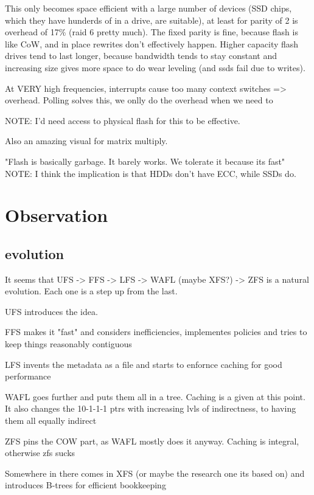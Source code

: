 \documentclass[a4paper]{report}
\begin{document}
        This only becomes space efficient with a large number of devices (SSD
        chips, which they have hunderds of in a drive, are suitable), at least
        for parity of 2 is overhead of 17\% (raid 6 pretty much). The fixed
        parity is fine, because flash is like CoW, and in place rewrites don't
        effectively happen. Higher capacity flash drives tend to last longer,
        because bandwidth tends to stay constant and increasing size gives more
        space to do wear leveling (and ssds fail due to writes).

        At VERY high frequencies, interrupts cause too many context switches =>
        overhead. Polling solves this, we onlly do the overhead when we need to

        NOTE: I'd need access to physical flash for this to be effective.

        Also an amazing visual for matrix multiply.

        "Flash is basically garbage. It barely works. We tolerate it because its fast"
        NOTE: I think the implication is that HDDs don't have ECC, while SSDs do.

\section{Observation}
    \subsection{evolution}

        It seems that UFS -> FFS -> LFS -> WAFL (maybe XFS?) -> ZFS is a
        natural evolution. Each one is a step up from the last.

        UFS introduces the idea.

        FFS makes it "fast" and considers inefficiencies, implementes policies
        and tries to keep things reasonably contiguous

        LFS invents the metadata as a file and starts to enfornce caching for
        good performance

        WAFL goes further and puts them all in a tree. Caching is a given at
        this point. It also changes the 10-1-1-1 ptrs with increasing lvls of
        indirectness, to having them all equally indirect

        ZFS pins the COW part, as WAFL mostly does it anyway. Caching is
        integral, otherwise zfs sucks

        Somewhere in there comes in XFS (or maybe the research one its based
        on) and introduces B-trees for efficient bookkeeping
\end{document}
